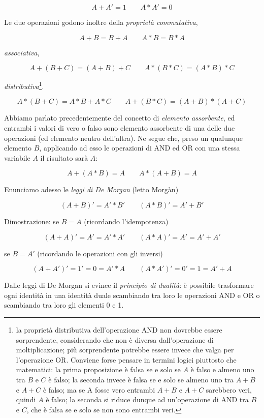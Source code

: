 \documentclass{article}
\begin{document}
\[A + A' = 1 \quad \quad A * A' = 0\]

Le due operazioni godono inoltre della \textit{proprietà commutativa},

\[A + B = B+ A \quad \quad A * B = B * A\]

\textit{associativa},

\[A + (B + C) = (A + B) + C \quad \quad A * (B * C) = (A * B) * C\]

\textit{distributiva}\footnote{la proprietà distributiva dell'operazione AND non dovrebbe essere sorprendente, considerando che non è diversa dall'operazione di moltiplicazione; più sorprendente potrebbe essere invece che valga per l'operazione OR. Conviene forse pensare in termini logici piuttosto che matematici: la prima proposizione è falsa se e solo se $A$ è falso e almeno uno tra $B$ e $C$ è falso; la seconda invece è falsa se e solo se almeno uno tra $A + B$ e $A + C$ è falso; ma se A fosse vero entrambi $A + B$ e $A + C$ sarebbero veri, quindi $A$ è falso; la seconda si riduce dunque ad un'operazione di AND tra $B$ e $C$, che è falsa se e solo se non sono entrambi veri.}.

\[A * (B + C) = A * B + A * C \quad \quad A + (B * C) = (A + B) * (A + C)\]

Abbiamo parlato precedentemente del concetto di \textit{elemento assorbente}, ed entrambi i valori di vero o falso sono elemento assorbente di una delle due operazioni (ed elemento neutro dell'altra). Ne segue che, preso un qualunque elemento $B$, applicando ad esso le operazioni di AND ed OR con una stessa variabile $A$ il risultato sarà $A$:

\[A + (A * B) = A \quad \quad A * (A + B) = A\]

Enunciamo adesso le \textit{leggi di De Morgan} (letto Morgàn)

\[(A + B)' = A' * B' \quad \quad (A * B)' = A' + B'\]

Dimostrazione: se $B = A$ (ricordando l'idempotenza)

\[(A + A)' = A' = A' * A' \quad \quad (A * A)' = A' = A' + A'\]

se $B = A'$ (ricordando le operazioni con gli inversi)

\[(A + A')' = 1' = 0 = A' * A \quad \quad (A * A')' = 0' = 1 = A' + A\]

Dalle leggi di De Morgan si evince il \textit{principio di dualità}: è possibile trasformare ogni identità in una identità duale scambiando tra loro le operazioni AND e OR o scambiando tra loro gli elementi 0 e 1.
\end{document}
